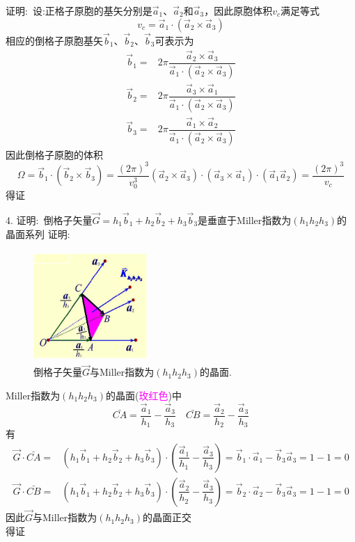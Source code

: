证明:~设:正格子原胞的基矢分别是$\vec a_1$、$\vec a_2$和$\vec a_3$，因此原胞体积$v_c$满足等式
\begin{displaymath}
	v_c=\vec a_1\cdot(\vec a_2\times\vec a_3)
\end{displaymath}
相应的倒格子原胞基矢$\vec b_1$、$\vec b_2$、$\vec b_3$可表示为
\begin{displaymath}
	\begin{aligned}
		\vec b_1=&2\pi\dfrac{\vec a_2\times\vec a_3}{\vec a_1\cdot(\vec a_2\times\vec a_3)}\\
		\vec b_2=&2\pi\dfrac{\vec a_3\times\vec a_1}{\vec a_1\cdot(\vec a_2\times\vec a_3)}\\
		\vec b_3=&2\pi\dfrac{\vec a_1\times\vec a_2}{\vec a_1\cdot(\vec a_2\times\vec a_3)}
	\end{aligned}
\end{displaymath}
因此倒格子原胞的体积
\begin{displaymath}
	\Omega=\vec b_1\cdot(\vec b_2\times\vec b_3)=\dfrac{(2\pi)^3}{v_0^3}(\vec a_2\times\vec a_3)\cdot(\vec a_3\times\vec a_1)\cdot(\vec a_1\vec a_2)=\dfrac{(2\pi)^3}{v_c}
\end{displaymath}
得证

4. 证明:~倒格子矢量$\vec G=h_1\vec b_1+h_2\vec b_2+h_3\vec b_3$是垂直于\textrm{Miller}指数为$(h_1h_2h_3)$的晶面系列
证明:~
\begin{figure}[h!]
\centering
\vspace*{-0.10in}
\includegraphics[height=1.65in,width=1.70in,viewport=0 0 245 224,clip]{Figures/Reciprocal_lattice_plane.png}
\caption{\small 倒格子矢量$\vec G$与\textrm{Miller}指数为$(h_1h_2h_3)$的晶面.}%
\label{Fig:Madelung_constant}
\end{figure}
\textrm{Miller}指数为$(h_1h_2h_3)$的晶面(\textcolor{magenta}{玫红色})中
\begin{displaymath}
	\bar{CA}=\dfrac{\vec a_1}{h_1}-\dfrac{\vec a_3}{h_3}\quad\bar{CB}=\dfrac{\vec a_2}{h_2}-\dfrac{\vec a_3}{h_3}
\end{displaymath}
有
\begin{displaymath}
	\begin{aligned}
		\vec G\cdot\bar{CA}=&(h_1\vec b_1+h_2\vec b_2+h_3\vec b_3)\cdot(\dfrac{\vec a_1}{h_1}-\dfrac{\vec a_3}{h_3})=\vec b_1\cdot\vec a_1-\vec b_3\vec a_3=1-1=0\\
	\vec G\cdot\bar{CB}=&(h_1\vec b_1+h_2\vec b_2+h_3\vec b_3)\cdot(\dfrac{\vec a_2}{h_2}-\dfrac{\vec a_3}{h_3})=\vec b_2\cdot\vec a_2-\vec b_3\vec a_3=1-1=0
	\end{aligned}
\end{displaymath}
因此$\vec G$与\textrm{Miller}指数为$(h_1h_2h_3)$的晶面正交\\得证

